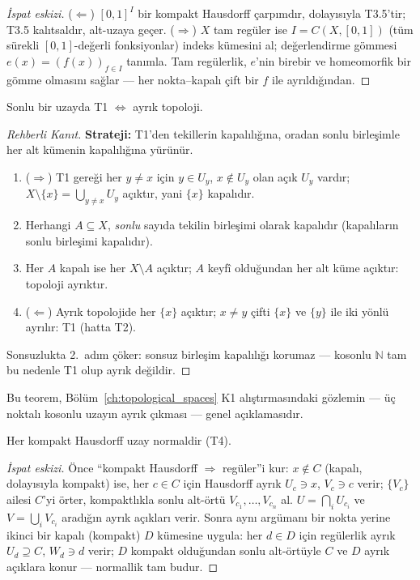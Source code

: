 \begin{proof}[İspat eskizi]
($\Leftarrow$) $[0,1]^I$ bir kompakt Hausdorff çarpımdır, dolayısıyla
T3.5'tir; T3.5 kalıtsaldır, alt-uzaya geçer. ($\Rightarrow$) $X$ tam regüler
ise $I = C(X,[0,1])$ (tüm sürekli $[0,1]$-değerli fonksiyonlar) indeks kümesini
al; değerlendirme gömmesi $e(x) = (f(x))_{f\in I}$ tanımla. Tam regülerlik,
$e$'nin birebir ve homeomorfik bir gömme olmasını sağlar --- her nokta--kapalı
çift bir $f$ ile ayrıldığından.
\end{proof}

\begin{theorem}
Sonlu bir uzayda T1 $\iff$ ayrık topoloji.
\end{theorem}
\begin{proof}[Rehberli Kanıt]
\textbf{Strateji:} T1'den tekillerin kapalılığına, oradan sonlu
birleşimle her alt kümenin kapalılığına yürünür.
\begin{enumerate}
  \item ($\Rightarrow$) T1 gereği her $y\neq x$ için $y\in U_y$,
        $x\notin U_y$ olan açık $U_y$ vardır;
        $X\setminus\{x\}=\bigcup_{y\neq x}U_y$ açıktır, yani $\{x\}$
        kapalıdır.
  \item Herhangi $A\subseteq X$, \emph{sonlu} sayıda tekilin birleşimi
        olarak kapalıdır (kapalıların sonlu birleşimi kapalıdır).
  \item Her $A$ kapalı ise her $X\setminus A$ açıktır; $A$ keyfî
        olduğundan her alt küme açıktır: topoloji ayrıktır.
  \item ($\Leftarrow$) Ayrık topolojide her $\{x\}$ açıktır; $x\neq y$
        çifti $\{x\}$ ve $\{y\}$ ile iki yönlü ayrılır: T1 (hatta T2).
\end{enumerate}
Sonsuzlukta 2.~adım çöker: sonsuz birleşim kapalılığı korumaz ---
kosonlu $\mathbb{N}$ tam bu nedenle T1 olup ayrık değildir.
\end{proof}

\noindent Bu teorem, Bölüm~\ref{ch:topological_spaces} K1
alıştırmasındaki gözlemin --- üç noktalı kosonlu uzayın ayrık çıkması
--- genel açıklamasıdır.

\begin{theorem}
Her kompakt Hausdorff uzay normaldir (T4).
\end{theorem}
\begin{proof}[İspat eskizi]
Önce ``kompakt Hausdorff $\Rightarrow$ regüler''i kur: $x \notin C$ (kapalı,
dolayısıyla kompakt) ise, her $c \in C$ için Hausdorff ayrık $U_c \ni x$,
$V_c \ni c$ verir; $\{V_c\}$ ailesi $C$'yi örter, kompaktlıkla sonlu alt-örtü
$V_{c_1},\dots,V_{c_n}$ al. $U = \bigcap_i U_{c_i}$ ve $V = \bigcup_i V_{c_i}$
aradığın ayrık açıkları verir. Sonra aynı argümanı bir nokta yerine ikinci bir
kapalı (kompakt) $D$ kümesine uygula: her $d \in D$ için regülerlik ayrık
$U_d \supseteq C$, $W_d \ni d$ verir; $D$ kompakt olduğundan sonlu alt-örtüyle
$C$ ve $D$ ayrık açıklara konur --- normallik tam budur.
\end{proof}

